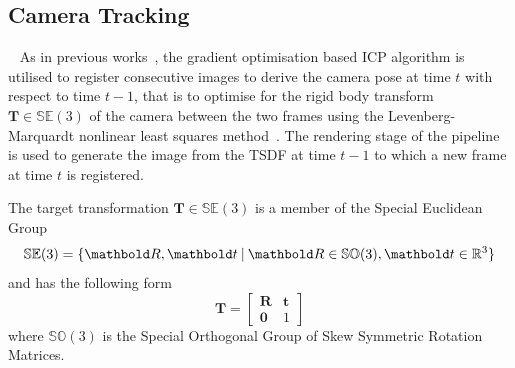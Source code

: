 \subsection{Camera Tracking}
~\label{subsec:moseg_static_camera_tracking}
As in previous works~\cite{Newcombe2011, Prisacariu2014}, the gradient
optimisation based ICP algorithm is utilised to register consecutive images
to derive the camera pose at time \(t\) with respect to time \(t-1\), that is to
optimise for the rigid body transform \(\bm{T} \in \mathbb{SE}(3)\) of the
camera between the two frames using the Levenberg-Marquardt nonlinear least
squares method~\cite{NumericalRecipes}. The rendering stage of the pipeline
is used to generate the image from the TSDF at time \(t-1\) to which a new frame
at time \(t\) is registered.

The target transformation \(\bm{T} \in \mathbb{SE}(3)\) is a member of the
Special Euclidean Group
\begin{equation}
  \label{eqn:se3_definition}
  \mathbb{SE}(3) = \{\bm{R}, \bm{t} \given \bm{R} \in
  \mathbb{SO}(3), \bm{t} \in \mathbb{R}^{3}\}
\end{equation}
and has the following form
\begin{equation}
  \label{eqn:trans_mat_definition}
  \bm{T} =
  \begin{bmatrix}
    \bm{R} & \bm{t} \\
    \bm{0} & 1
  \end{bmatrix}
\end{equation}
where \(\mathbb{SO}(3)\) is the Special Orthogonal Group of Skew Symmetric
Rotation Matrices.

